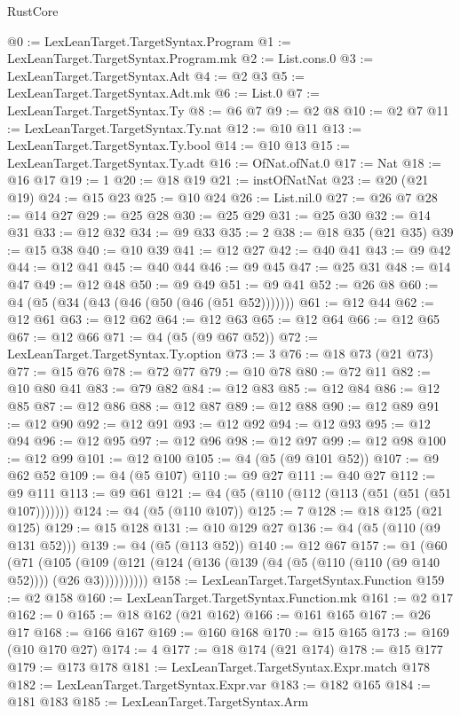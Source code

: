 \begin{lexlean}{RustCore}
\begin{coremodule}
@0 := LexLeanTarget.TargetSyntax.Program
@1 := LexLeanTarget.TargetSyntax.Program.mk
@2 := List.cons.{0}
@3 := LexLeanTarget.TargetSyntax.Adt
@4 := @2 @3
@5 := LexLeanTarget.TargetSyntax.Adt.mk
@6 := List.{0}
@7 := LexLeanTarget.TargetSyntax.Ty
@8 := @6 @7
@9 := @2 @8
@10 := @2 @7
@11 := LexLeanTarget.TargetSyntax.Ty.nat
@12 := @10 @11
@13 := LexLeanTarget.TargetSyntax.Ty.bool
@14 := @10 @13
@15 := LexLeanTarget.TargetSyntax.Ty.adt
@16 := OfNat.ofNat.{0}
@17 := Nat
@18 := @16 @17
@19 := 1
@20 := @18 @19
@21 := instOfNatNat
@23 := @20 (@21 @19)
@24 := @15 @23
@25 := @10 @24
@26 := List.nil.{0}
@27 := @26 @7
@28 := @14 @27
@29 := @25 @28
@30 := @25 @29
@31 := @25 @30
@32 := @14 @31
@33 := @12 @32
@34 := @9 @33
@35 := 2
@38 := @18 @35 (@21 @35)
@39 := @15 @38
@40 := @10 @39
@41 := @12 @27
@42 := @40 @41
@43 := @9 @42
@44 := @12 @41
@45 := @40 @44
@46 := @9 @45
@47 := @25 @31
@48 := @14 @47
@49 := @12 @48
@50 := @9 @49
@51 := @9 @41
@52 := @26 @8
@60 := @4 (@5 (@34 (@43 (@46 (@50 (@46 (@51 @52)))))))
@61 := @12 @44
@62 := @12 @61
@63 := @12 @62
@64 := @12 @63
@65 := @12 @64
@66 := @12 @65
@67 := @12 @66
@71 := @4 (@5 (@9 @67 @52))
@72 := LexLeanTarget.TargetSyntax.Ty.option
@73 := 3
@76 := @18 @73 (@21 @73)
@77 := @15 @76
@78 := @72 @77
@79 := @10 @78
@80 := @72 @11
@82 := @10 @80 @41
@83 := @79 @82
@84 := @12 @83
@85 := @12 @84
@86 := @12 @85
@87 := @12 @86
@88 := @12 @87
@89 := @12 @88
@90 := @12 @89
@91 := @12 @90
@92 := @12 @91
@93 := @12 @92
@94 := @12 @93
@95 := @12 @94
@96 := @12 @95
@97 := @12 @96
@98 := @12 @97
@99 := @12 @98
@100 := @12 @99
@101 := @12 @100
@105 := @4 (@5 (@9 @101 @52))
@107 := @9 @62 @52
@109 := @4 (@5 @107)
@110 := @9 @27
@111 := @40 @27
@112 := @9 @111
@113 := @9 @61
@121 := @4 (@5 (@110 (@112 (@113 (@51 (@51 (@51 @107)))))))
@124 := @4 (@5 (@110 @107))
@125 := 7
@128 := @18 @125 (@21 @125)
@129 := @15 @128
@131 := @10 @129 @27
@136 := @4 (@5 (@110 (@9 @131 @52)))
@139 := @4 (@5 (@113 @52))
@140 := @12 @67
@157 := @1
    (@60
      (@71
        (@105 (@109 (@121 (@124 (@136 (@139 (@4 (@5 (@110 (@110 (@9 @140 @52)))) (@26 @3))))))))))
@158 := LexLeanTarget.TargetSyntax.Function
@159 := @2 @158
@160 := LexLeanTarget.TargetSyntax.Function.mk
@161 := @2 @17
@162 := 0
@165 := @18 @162 (@21 @162)
@166 := @161 @165
@167 := @26 @17
@168 := @166 @167
@169 := @160 @168
@170 := @15 @165
@173 := @169 (@10 @170 @27)
@174 := 4
@177 := @18 @174 (@21 @174)
@178 := @15 @177
@179 := @173 @178
@181 := LexLeanTarget.TargetSyntax.Expr.match @178
@182 := LexLeanTarget.TargetSyntax.Expr.var
@183 := @182 @165
@184 := @181 @183
@185 := LexLeanTarget.TargetSyntax.Arm

\end{coremodule}
\end{lexlean}
